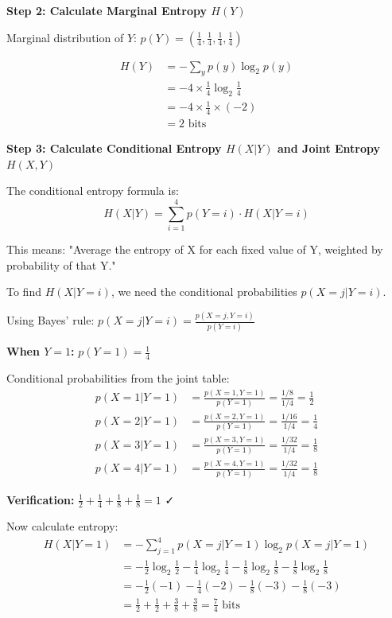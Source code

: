\documentclass[11pt,a4paper]{book}
\newenvironment{formulabox}[1][Formula]{
    \begin{tcolorbox}[
        enhanced,
        breakable,
        colback=softcoral!10,
        colframe=softcoral!200,
        title=#1,
        fonttitle=\bfseries,
        coltitle=white,
        sharp corners,
        boxrule=1pt,
        left=8pt,
        right=8pt,
        top=6pt,
        bottom=6pt
    ]
}{
    \end{tcolorbox}
}
\newcounter{qna}[chapter]
\renewcommand{\theqna}{\thechapter.\arabic{qna}}
\newenvironment{questionanswerbox}{
    \refstepcounter{qna}%
    \begin{tcolorbox}[
        enhanced,
        breakable,
        colback=softlavender!10,
        colframe=softlavender!200,
        title={Example~\theqna}, %
        fonttitle=\bfseries,
        coltitle=white,
        colbacktitle=softlavender!200,
        sharp corners,
        boxrule=1pt,
        left=8pt,
        right=8pt,
        top=6pt,
        bottom=6pt
    ]
}{
    \end{tcolorbox}
}
\begin{document}
\begin{questionanswerbox}
    \textbf{Step 2: Calculate Marginal Entropy \(H(Y)\)}

    Marginal distribution of \(Y\): \(p(Y) = \left(\frac{1}{4}, \frac{1}{4}, \frac{1}{4}, \frac{1}{4}\right)\)

    \begin{align*}
        H(Y) & = -\sum_{y} p(y) \log_2 p(y)              \\
             & = -4 \times \frac{1}{4}\log_2 \frac{1}{4} \\
             & = -4 \times \frac{1}{4} \times (-2)       \\
             & = 2 \text{ bits}
    \end{align*}

    \textbf{Step 3: Calculate Conditional Entropy \(H(X|Y)\) and Joint Entropy \(H(X,Y)\)}

    The conditional entropy formula is:
    \[
        H(X|Y) = \sum_{i=1}^{4} p(Y=i) \cdot H(X|Y=i)
    \]

    This means: "Average the entropy of X for each fixed value of Y, weighted by probability of that Y."

    \begin{formulabox}[Bayes' rule]
        To find \(H(X|Y=i)\), we need the conditional probabilities \(p(X=j|Y=i)\).

        Using Bayes' rule: \(p(X=j|Y=i) = \frac{p(X=j, Y=i)}{p(Y=i)}\)
    \end{formulabox}

    \hrulefill

    \textbf{When \(Y=1\):} \(p(Y=1) = \frac{1}{4}\)

    Conditional probabilities from the joint table:
    \begin{align*}
        p(X=1|Y=1) & = \frac{p(X=1,Y=1)}{p(Y=1)} = \frac{1/8}{1/4} = \frac{1}{2}  \\
        p(X=2|Y=1) & = \frac{p(X=2,Y=1)}{p(Y=1)} = \frac{1/16}{1/4} = \frac{1}{4} \\
        p(X=3|Y=1) & = \frac{p(X=3,Y=1)}{p(Y=1)} = \frac{1/32}{1/4} = \frac{1}{8} \\
        p(X=4|Y=1) & = \frac{p(X=4,Y=1)}{p(Y=1)} = \frac{1/32}{1/4} = \frac{1}{8}
    \end{align*}

    \textbf{Verification:} \(\frac{1}{2} + \frac{1}{4} + \frac{1}{8} + \frac{1}{8} = 1\) ✓

    Now calculate entropy:
    \begin{align*}
        H(X|Y=1) & = -\sum_{j=1}^{4} p(X=j|Y=1) \log_2 p(X=j|Y=1)                                                                               \\
                 & = -\frac{1}{2}\log_2\frac{1}{2} - \frac{1}{4}\log_2\frac{1}{4} - \frac{1}{8}\log_2\frac{1}{8} - \frac{1}{8}\log_2\frac{1}{8} \\
                 & = -\frac{1}{2}(-1) - \frac{1}{4}(-2) - \frac{1}{8}(-3) - \frac{1}{8}(-3)                                                     \\
                 & = \frac{1}{2} + \frac{1}{2} + \frac{3}{8} + \frac{3}{8} = \frac{7}{4} \text{ bits}
    \end{align*}


\end{questionanswerbox}
\end{document}
